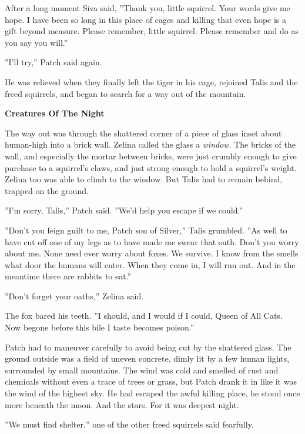 \documentclass[11pt]{article}
\begin{document}
After a long moment Siva said, ''Thank you, little squirrel. Your words give me hope. I have been so long in this place of cages and killing that even hope is a gift beyond measure. Please remember, little squirrel. Please remember and do as you say you will.''\par
''I'll try,'' Patch said again.\par
He was relieved when they finally left the tiger in his cage, rejoined Talis and the freed squirrels, and began to search for a way out of the mountain.\par
\par
{\bf Creatures Of The Night\par
}\par
 The way out was through the shattered corner of a piece of glass inset about human-high into a brick wall. Zelina called the glass a {\it window}. The bricks of the wall, and especially the mortar between bricks, were just crumbly enough to give purchase to a squirrel's claws, and just strong enough to hold a squirrel's weight. Zelina too was able to climb to the window. But Talis had to remain behind, trapped on the ground.\par
 ''I'm sorry, Talis,'' Patch said. ''We'd help you escape if we could.''\par
 ''Don't you feign guilt to me, Patch son of Silver,'' Talis grumbled. ''As well to have cut off one of my legs as to have made me swear that oath. Don't you worry about me. None need ever worry about foxes. We survive. I know from the smells what door the humans will enter. When they come in, I will run out. And in the meantime there are rabbits to eat.''\par
 ''Don't forget your oaths,'' Zelina said.\par
 The fox bared his teeth. ''I should, and I would if I could, Queen of All Cats. Now begone before this bile I taste becomes poison.''\par
 Patch had to maneuver carefully to avoid being cut by the shattered glass. The ground outside was a field of uneven concrete, dimly lit by a few human lights, surrounded by small mountains. The wind was cold and smelled of rust and chemicals without even a trace of trees or grass, but Patch drank it in like it was the wind of the highest sky. He had escaped the awful killing place, he stood once more beneath the moon. And the stars. For it was deepest night.\par
 ''We must find shelter,'' one of the other freed squirrels said fearfully.\par
\end{document}
